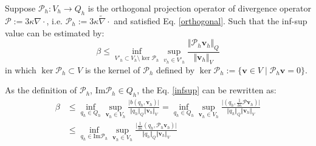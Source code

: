 \begin{lma}\label{lma}
Suppose $\mathcal P_h:V_h \rightarrow Q_h$ is the orthogonal projection operator of divergence operator $\mathcal P := 3\kappa \nabla \cdot$, i.e. $\mathcal P_h:= 3\kappa \tilde \nabla \cdot$ and satisfied Eq. \eqref{orthogonal}.
Such that the inf-sup value can be estimated by:
\begin{equation}\label{r1}
    \beta \le \inf_{V'_h \subset V_h \setminus \ker \mathcal P_h} \sup_{v_h \in V'_h} \frac{\Vert \mathcal P_h \boldsymbol v_h \Vert_Q}{\Vert \boldsymbol v_h \Vert_V}
\end{equation}
    in which $\ker \mathcal P_h \subset V$ is the kernel of $\mathcal P_h$ defined by $\ker \mathcal P_h := \{ \boldsymbol v \in V \;\vert\; \mathcal P_h \boldsymbol v = 0 \}$.
\end{lma}
\begin{pf}
As the definition of  $\mathcal P_h$, $\mathrm{Im}\mathcal P_h \in Q_h$, the Eq. \eqref{infsup} can be rewritten as:
\begin{equation} \label{r11}
\begin{split}
    \beta &\le \inf_{q_h \in Q_h} \sup_{\boldsymbol v_h \in V_h} \frac{\vert b(q_h,\boldsymbol v_h) \vert}{\Vert q_h \Vert_Q \Vert \boldsymbol v_h \Vert_V} 
    = \inf_{q_h \in Q_h} \sup_{\boldsymbol v_h \in V_h} \frac{\vert (q_h,\frac{1}{3\kappa}\mathcal P \boldsymbol v_h) \vert}{\Vert q_h \Vert_Q \Vert \boldsymbol v_h \Vert_V} \\
    &\le \inf_{q_h \in \mathrm{Im} \mathcal P_h} \sup_{\boldsymbol v_h \in V_h} \frac{\vert \frac{1}{3\kappa}(q_h,\mathcal P_h \boldsymbol v_h) \vert}{\Vert q_h \Vert_Q \Vert \boldsymbol v_h \Vert_V} 
\end{split}
\end{equation}


\end{pf}
